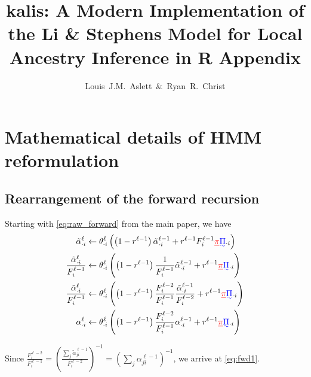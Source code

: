 \documentclass[a4paper]{article}
\title{kalis: A Modern Implementation of the Li \& Stephens Model for Local Ancestry Inference in R \newline Appendix}
\author{Louis~J.M.~Aslett~\&~Ryan~R.~Christ}
\date{}
\providecommand{\DIFadd}[1]{{\protect\color{blue}\uwave{#1}}} %
\providecommand{\DIFdel}[1]{{\protect\color{red}\sout{#1}}}                      %
\providecommand{\DIFaddbegin}{} %
\providecommand{\DIFaddend}{} %
\providecommand{\DIFdelbegin}{} %
\providecommand{\DIFdelend}{} %
\newcommand{\DIFscaledelfig}{0.5}
\newlength{\DIFdelgraphicswidth} %
\newlength{\DIFdelgraphicsheight} %
\newcommand{\DIFaddincludegraphics}[2][]{{\color{blue}\fbox{\DIFOincludegraphics[#1]{#2}}}} %
\newcommand{\DIFdelincludegraphics}[2][]{%
\sbox{\DIFdelgraphicsbox}{\DIFOincludegraphics[#1]{#2}}%
\settoboxwidth{\DIFdelgraphicswidth}{\DIFdelgraphicsbox} %
\settoboxtotalheight{\DIFdelgraphicsheight}{\DIFdelgraphicsbox} %
\scalebox{\DIFscaledelfig}{%
\parbox[b]{\DIFdelgraphicswidth}{\usebox{\DIFdelgraphicsbox}\\[-\baselineskip] \rule{\DIFdelgraphicswidth}{0em}}\llap{\resizebox{\DIFdelgraphicswidth}{\DIFdelgraphicsheight}{%
\setlength{\unitlength}{\DIFdelgraphicswidth}%
\begin{picture}(1,1)%
\thicklines\linethickness{2pt} %
{\color[rgb]{1,0,0}\put(0,0){\framebox(1,1){}}}%
{\color[rgb]{1,0,0}\put(0,0){\line( 1,1){1}}}%
{\color[rgb]{1,0,0}\put(0,1){\line(1,-1){1}}}%
\end{picture}%
}\hspace*{3pt}}} %
} %
\DeclareRobustCommand{\DIFaddbegin}{\DIFOaddbegin \let\includegraphics\DIFaddincludegraphics} %
\DeclareRobustCommand{\DIFaddend}{\DIFOaddend \let\includegraphics\DIFOincludegraphics} %
\DeclareRobustCommand{\DIFdelbegin}{\DIFOdelbegin \let\includegraphics\DIFdelincludegraphics} %
\DeclareRobustCommand{\DIFdelend}{\DIFOaddend \let\includegraphics\DIFOincludegraphics} %
\begin{document}
\maketitle
\appendix



\section{Mathematical details of HMM reformulation}
\label{mathematical-details-of-hmm-reformulation}



\subsection{Rearrangement of the forward recursion}
\label{apx:fwd}

Starting with \eqref{eq:raw_forward} from the main paper, we have
\begin{align}
	\tilde{\alpha}_{\cdot i}^{\ell} & \gets \theta^{\ell}_{\cdot i}  \left( \left(1-r^{\ell-1}\right) \tilde{\alpha}_{\cdot i}^{\ell-1} + r^{\ell-1} F_i^{\ell-1}  \DIFdelbegin \DIFdel{\pi}\DIFdelend \DIFaddbegin \DIFadd{\Pi}\DIFaddend _{\cdot i} \right) \nonumber \\
	\frac{\tilde{\alpha}_{\cdot i}^{\ell}}{ F_i^{\ell-1}} & \gets \theta^{\ell}_{\cdot i} \left( \left(1-r^{\ell-1}\right) \frac{1}{{ F_i^{\ell-1}}}\tilde{\alpha}_{\cdot i}^{\ell-1} + r^{\ell-1} \DIFdelbegin \DIFdel{\pi}\DIFdelend \DIFaddbegin \DIFadd{\Pi}\DIFaddend _{\cdot i} \right) \nonumber \\
	\frac{\tilde{\alpha}_{\cdot i}^{\ell}}{ F_i^{\ell-1}} & \gets \theta^{\ell}_{\cdot i} \left( \left(1-r^{\ell-1}\right) \frac{F_i^{\ell-2}}{{ F_i^{\ell-1}}} \frac{\tilde{\alpha}_{\cdot i}^{\ell-1}}{F_i^{\ell-2}} + r^{\ell-1} \DIFdelbegin \DIFdel{\pi}\DIFdelend \DIFaddbegin \DIFadd{\Pi}\DIFaddend _{\cdot i} \right) \nonumber \\
	\alpha_{\cdot i}^{\ell} & \gets \theta^{\ell}_{\cdot i} \left( \left(1-r^{\ell-1}\right) \frac{F_i^{\ell-2}}{{ F_i^{\ell-1}}} \alpha_{\cdot i}^{\ell-1} + r^{\ell-1} \DIFdelbegin \DIFdel{\pi}\DIFdelend \DIFaddbegin \DIFadd{\Pi}\DIFaddend _{\cdot i} \right) \nonumber
\end{align}

Since
\(\frac{F_i^{\ell-2}}{F_i^{\ell-1}} = \left( \frac{ \underset{j}{\sum} \tilde{\alpha}_{ji}^{\ell-1}}{ F_i^{\ell-2}}\right)^{-1} = \left( \underset{j}{\sum} \alpha_{ji}^{\ell-1} \right)^{-1}\),
we arrive at \eqref{eq:fwd1}.
\end{document}
